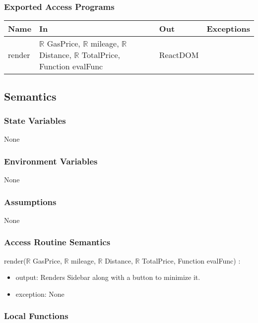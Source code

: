 \documentclass[12pt, titlepage]{article}
\begin{document}
\subsubsection{Exported Access Programs}

\begin{tabular}{| l | l | l | l |}
  \hline
  \textbf{Name} & \textbf{In} & \textbf{Out} & \textbf{Exceptions}\\
  \hline
  render & $\mathbb{R}$ GasPrice, $\mathbb{R}$ mileage, $\mathbb{R}$ Distance, $\mathbb{R}$ TotalPrice, Function evalFunc & ReactDOM & ~\\
  \hline
\end{tabular}

\subsection{Semantics}

\subsubsection{State Variables}

None

\subsubsection{Environment Variables}

None

\subsubsection{Assumptions}

None

\subsubsection{Access Routine Semantics}

\noindent render($\mathbb{R}$ GasPrice, $\mathbb{R}$ mileage, $\mathbb{R}$ Distance, $\mathbb{R}$ TotalPrice, Function evalFunc) :
\begin{itemize}
\item output: Renders Sidebar along with a button to minimize it.
\item exception: None
\end{itemize}

\subsubsection{Local Functions}
\end{document}
